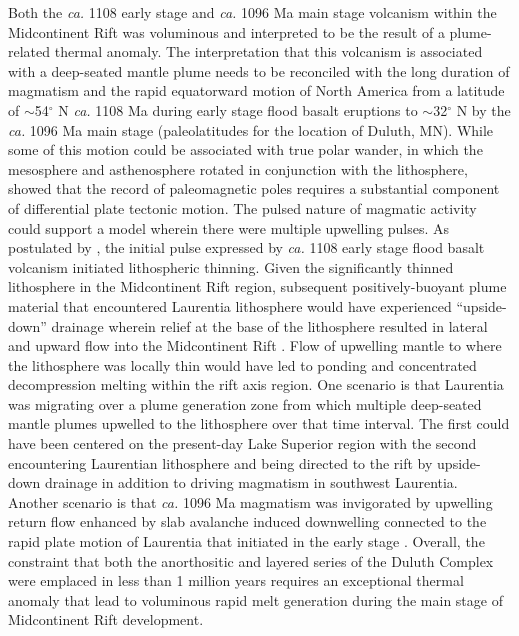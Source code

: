 \documentclass[11pt,letterpaper]{article}
\begin{document}
Both the \textit{ca.} 1108 early stage and \textit{ca.} 1096 Ma main stage volcanism within the Midcontinent Rift was voluminous and interpreted to be the result of a plume-related thermal anomaly. The interpretation that this volcanism is associated with a deep-seated mantle plume needs to be reconciled with the long duration of magmatism and the rapid equatorward motion of North America from a latitude of $\sim$54$^{\circ}$ N \textit{ca.} 1108 Ma during early stage flood basalt eruptions to $\sim$32$^{\circ}$ N by the \textit{ca.} 1096 Ma main stage (paleolatitudes for the location of Duluth, MN). While some of this motion could be associated with true polar wander, in which the mesosphere and asthenosphere rotated in conjunction with the lithosphere, \cite{Swanson-Hysell2019a} showed that the record of paleomagnetic poles requires a substantial component of differential plate tectonic motion. The pulsed nature of magmatic activity could support a model wherein there were multiple upwelling pulses. As postulated by \cite{Cannon1992a}, the initial pulse expressed by \textit{ca.} 1108 early stage flood basalt volcanism initiated lithospheric thinning. Given the significantly thinned lithosphere in the Midcontinent Rift region, subsequent positively-buoyant plume material that encountered Laurentia lithosphere would have experienced ``upside-down'' drainage wherein relief at the base of the lithosphere resulted in lateral and upward flow into the Midcontinent Rift \citep{Sleep1997a, Swanson-Hysell2014b}. Flow of upwelling mantle to where the lithosphere was locally thin would have led to ponding and concentrated decompression melting within the rift axis region. One scenario is that Laurentia was migrating over a plume generation zone \citep{Burke2008a} from which multiple deep-seated mantle plumes upwelled to the lithosphere over that time interval. The first could have been centered on the present-day Lake Superior region with the second encountering Laurentian lithosphere and being directed to the rift by upside-down drainage in addition to driving magmatism in southwest Laurentia. Another scenario is that \textit{ca.} 1096 Ma magmatism was invigorated by upwelling return flow enhanced by slab avalanche induced downwelling connected to the rapid plate motion of Laurentia that initiated in the early stage \citep{Swanson-Hysell2019a}. Overall, the constraint that both the anorthositic and layered series of the Duluth Complex were emplaced in less than 1 million years requires an exceptional thermal anomaly that lead to voluminous rapid melt generation during the main stage of Midcontinent Rift development.
\end{document}
